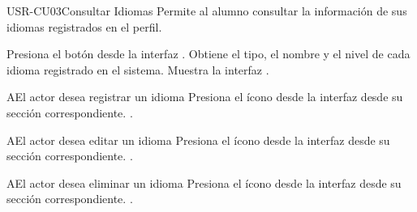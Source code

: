 \begin{UseCase}[]{USR-CU03}{Consultar Idiomas}{
	Permite al alumno consultar la información de sus idiomas registrados en el perfil.
}
\end{UseCase}

\begin{UCtrayectoria}
	\UCpaso [\UCactor] Presiona el botón  desde la interfaz .
    \UCpaso [\UCsist] Obtiene el tipo, el nombre y el nivel de cada idioma registrado en el sistema.
	\UCpaso [\UCsist] Muestra la interfaz .
\end{UCtrayectoria}

\begin{UCtrayectoriaA}{A}{El actor desea registrar un idioma}
	\UCpaso [\UCsist] Presiona el ícono \IUAgregar{} desde la interfaz  desde su sección correspondiente.
	.
\end{UCtrayectoriaA} 

\begin{UCtrayectoriaA}{A}{El actor desea editar un idioma}
	\UCpaso [\UCsist] Presiona el ícono \IUEditar{} desde la interfaz  desde su sección correspondiente.
	.
\end{UCtrayectoriaA} 

\begin{UCtrayectoriaA}{A}{El actor desea eliminar un idioma}
	\UCpaso [\UCsist] Presiona el ícono \IUEliminar{} desde la interfaz  desde su sección correspondiente.
	.
\end{UCtrayectoriaA} 